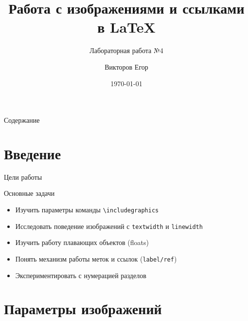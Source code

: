 \documentclass[utf8, 12pt]{beamer}
\title{Работа с изображениями и ссылками в \LaTeX}
\subtitle{Лабораторная работа №4}
\author{Викторов Егор}
\institute{Российский Университет Дружбы Народов имени Патриса Лумумбы}
\date{\today}
\begin{document}
\begin{frame}
    \titlepage
\end{frame}

\begin{frame}{Содержание}
    \tableofcontents
\end{frame}

\section{Введение}

\begin{frame}{Цели работы}
    \begin{block}{Основные задачи}
        \begin{itemize}
            \item Изучить параметры команды \texttt{\textbackslash includegraphics}
            \item Исследовать поведение изображений с \texttt{textwidth} и \texttt{linewidth}
            \item Изучить работу плавающих объектов (floats)
            \item Понять механизм работы меток и ссылок (\texttt{label/ref})
            \item Экспериментировать с нумерацией разделов
        \end{itemize}
    \end{block}
\end{frame}

\section{Параметры изображений}
\end{document}
